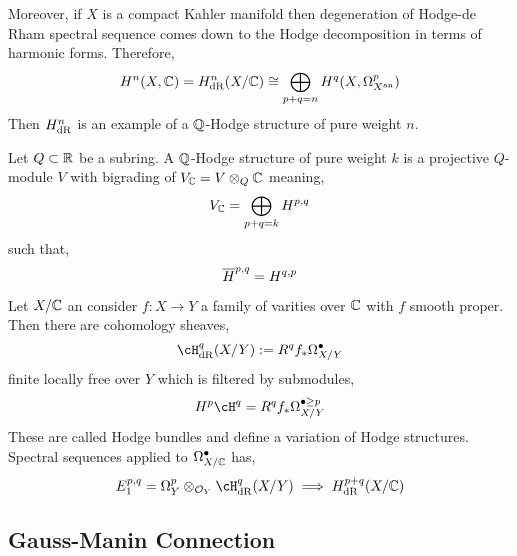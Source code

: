\documentclass[12pt]{article}
\begin{document}
Moreover, if $X$ is a compact Kahler manifold then degeneration of Hodge-de Rham spectral sequence comes down to the Hodge decomposition in terms of harmonic forms. Therefore,
\[ H^n(X, \mathbb{C}) = H_{\mathrm{dR}}^n(X/\mathbb{C}) \cong \bigoplus_{p+q=n} H^q(X, \Omega^p_{X^{\mathrm{an}}}) \]
Then $H_{\mathrm{dR}}^n$ is an example of a $\mathbb{Q}$-Hodge structure of pure weight $n$.

\begin{defn}
Let $Q \subset \mathbb{R}$ be a subring. A $\mathbb{Q}$-Hodge structure of pure weight $k$ is a projective $Q$-module $V$ with bigrading of $V_{\mathbb{C}} = V \otimes_{Q} {\mathbb{C}}$ meaning,
\[ V_{\mathbb{C}} = \bigoplus_{p+q = k} H^{p,q} \]
such that,
\[ \overline{H}^{p,q} = H^{q,p} \]
\end{defn}

Let $X / \mathbb{C}$ an consider $f : X \to Y$ a family of varities over $\mathbb{C}$ with $f$ smooth proper. Then there are cohomology sheaves,
\[ \cH^q_{\dR}(X/Y) := R^q f_* \Omega^\bullet_{X/Y} \]
finite locally free over $Y$ which is filtered by submodules,
\[ H^p \cH^q = R^q f_* \Omega_{X/Y}^{\bullet \ge p} \]
These are called Hodge bundles and define a variation of Hodge structures. Spectral sequences applied to $\Omega^\bullet_{X/\mathbb{C}}$ has,
\[ E^{p,q}_1 = \Omega_{Y}^p \ot_{\struct{Y}} \cH_{\dR}^{q}(X/Y) \implies H^{p+q}_{\dR}(X/\CC) \]

\subsection{Gauss-Manin Connection}
\end{document}
